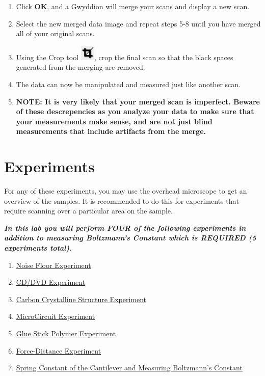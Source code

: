 \documentclass{../lab}
\begin{document}
\begin{enumerate}
    \item Click \textbf{OK}, and a Gwyddion will merge your scans and display a new scan.
    
    \item Select the new merged data image and repeat steps 5-8 until you have merged all of your original scans.
    
    \item Using the Crop tool \includegraphics[height=2em]{images/33.png}, crop the final scan so that the black spaces generated from the merging are removed.
    
    \item The data can now be manipulated and measured just like another scan.
    
    \item\textbf{NOTE: It is very likely that your merged scan is imperfect.  Beware of these descrepencies as you analyze your data to make sure that your measurements make sense, and are not just blind measurements that include artifacts from the merge.}
\end{enumerate}

\section{Experiments}
\label{sec:Experiments}

For any of these experiments, you may use the overhead microscope to get an overview of the samples. It is recommended to do this for experiments that require scanning over a particular area on the sample.

\emph{\textbf{In this lab you will perform FOUR of the following experiments in addition to measuring Boltzmann's Constant which is REQUIRED (5 experiments total).}}

\begin{enumerate}

\item \hyperref[subsec:NoiseFloor]{Noise Floor Experiment}

\item \hyperref[subsec:CD/DVD]{CD/DVD Experiment}

\item \hyperref[subsec:CarbonCrystal]{Carbon Crystalline Structure Experiment}

\item \hyperref[subsec:Microcircuit]{MicroCircuit Experiment}

\item \hyperref[subsec:GlueStick]{Glue Stick Polymer Experiment}

\item \hyperref[subsec:ForceDistance]{Force-Distance Experiment}

\item \hyperref[subsec:Boltzmann]{Spring Constant of the Cantilever and Measuring Boltzmann's Constant}

\end{enumerate}
\end{document}
